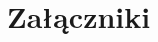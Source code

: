\documentclass[paper=a4, fontsize=12pt]{scrartcl}
\numberwithin{equation}{section}		%
\numberwithin{figure}{section}			%
\numberwithin{table}{section}				%
\begin{document}






\section{Załączniki}
\end{document}
